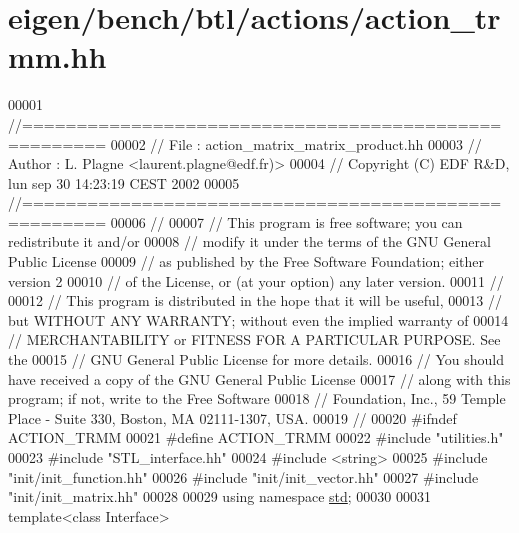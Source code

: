 \hypertarget{eigen_2bench_2btl_2actions_2action__trmm_8hh_source}{}\section{eigen/bench/btl/actions/action\+\_\+trmm.hh}
\label{eigen_2bench_2btl_2actions_2action__trmm_8hh_source}

\begin{DoxyCode}
00001 \textcolor{comment}{//=====================================================}
00002 \textcolor{comment}{// File   :  action\_matrix\_matrix\_product.hh}
00003 \textcolor{comment}{// Author :  L. Plagne <laurent.plagne@edf.fr)>}
00004 \textcolor{comment}{// Copyright (C) EDF R&D,  lun sep 30 14:23:19 CEST 2002}
00005 \textcolor{comment}{//=====================================================}
00006 \textcolor{comment}{//}
00007 \textcolor{comment}{// This program is free software; you can redistribute it and/or}
00008 \textcolor{comment}{// modify it under the terms of the GNU General Public License}
00009 \textcolor{comment}{// as published by the Free Software Foundation; either version 2}
00010 \textcolor{comment}{// of the License, or (at your option) any later version.}
00011 \textcolor{comment}{//}
00012 \textcolor{comment}{// This program is distributed in the hope that it will be useful,}
00013 \textcolor{comment}{// but WITHOUT ANY WARRANTY; without even the implied warranty of}
00014 \textcolor{comment}{// MERCHANTABILITY or FITNESS FOR A PARTICULAR PURPOSE.  See the}
00015 \textcolor{comment}{// GNU General Public License for more details.}
00016 \textcolor{comment}{// You should have received a copy of the GNU General Public License}
00017 \textcolor{comment}{// along with this program; if not, write to the Free Software}
00018 \textcolor{comment}{// Foundation, Inc., 59 Temple Place - Suite 330, Boston, MA  02111-1307, USA.}
00019 \textcolor{comment}{//}
00020 \textcolor{preprocessor}{#ifndef ACTION\_TRMM}
00021 \textcolor{preprocessor}{#define ACTION\_TRMM}
00022 \textcolor{preprocessor}{#include "utilities.h"}
00023 \textcolor{preprocessor}{#include "STL\_interface.hh"}
00024 \textcolor{preprocessor}{#include <string>}
00025 \textcolor{preprocessor}{#include "init/init\_function.hh"}
00026 \textcolor{preprocessor}{#include "init/init\_vector.hh"}
00027 \textcolor{preprocessor}{#include "init/init\_matrix.hh"}
00028 
00029 \textcolor{keyword}{using namespace }\hyperlink{namespacestd}{std};
00030 
00031 \textcolor{keyword}{template}<\textcolor{keyword}{class} Interface>

\end{DoxyCode}
